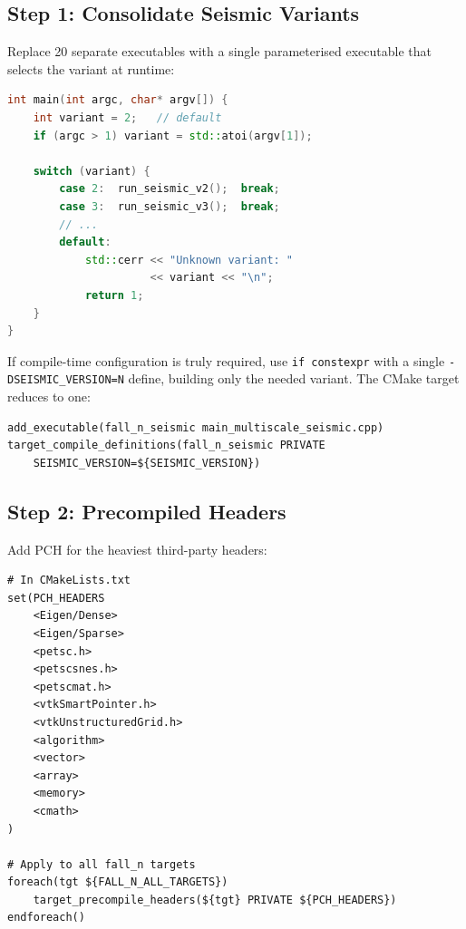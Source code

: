 \subsection{Step 1: Consolidate Seismic Variants}
\label{sec:build-seismic-consolidate}

Replace 20 separate executables with a single parameterised
executable that selects the variant at runtime:

\begin{lstlisting}[language=C++, caption={Proposed unified seismic driver.}]
int main(int argc, char* argv[]) {
    int variant = 2;   // default
    if (argc > 1) variant = std::atoi(argv[1]);
    
    switch (variant) {
        case 2:  run_seismic_v2();  break;
        case 3:  run_seismic_v3();  break;
        // ...
        default:
            std::cerr << "Unknown variant: "
                      << variant << "\n";
            return 1;
    }
}
\end{lstlisting}

If compile-time configuration is truly required, use
\texttt{if constexpr} with a single \texttt{-DSEISMIC\_VERSION=N}
define, building only the needed variant.  The CMake target reduces
to one:

\begin{lstlisting}
add_executable(fall_n_seismic main_multiscale_seismic.cpp)
target_compile_definitions(fall_n_seismic PRIVATE
    SEISMIC_VERSION=${SEISMIC_VERSION})
\end{lstlisting}


\subsection{Step 2: Precompiled Headers}
\label{sec:build-pch}

Add PCH for the heaviest third-party headers:

\begin{lstlisting}[caption={CMake PCH setup.}]
# In CMakeLists.txt
set(PCH_HEADERS
    <Eigen/Dense>
    <Eigen/Sparse>
    <petsc.h>
    <petscsnes.h>
    <petscmat.h>
    <vtkSmartPointer.h>
    <vtkUnstructuredGrid.h>
    <algorithm>
    <vector>
    <array>
    <memory>
    <cmath>
)

# Apply to all fall_n targets
foreach(tgt ${FALL_N_ALL_TARGETS})
    target_precompile_headers(${tgt} PRIVATE ${PCH_HEADERS})
endforeach()
\end{lstlisting}


